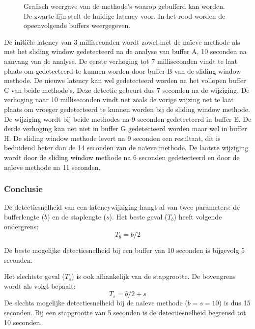 \begin{figure}[h!]
	\captionsetup{width=0.7\textwidth}
	\caption[Voorbeeld buffering methodes]{Grafisch weergave van de methode's waarop gebufferd kan worden. De zwarte lijn stelt de huidige latency voor. In het rood worden de opeenvolgende buffers weergegeven.}
	\begin{center}
		\advance\parskip0.3cm
		
	\end{center}
	\label{latency}
\end{figure}

De initiële latency van 3 milliseconden wordt zowel met de naïeve methode als met het sliding window gedetecteerd na de analyse van buffer A, 10 seconden na aanvang van de analyse. De eerste verhoging tot 7 milliseconden vindt te laat plaats om gedetecteerd te kunnen worden door buffer B van de sliding window methode. De nieuwe latency kan wel gedetecteerd worden na het vollopen buffer C van beide methode's. Deze detectie gebeurt dus 7 seconden na de wijziging. De verhoging naar 10 milliseconden vindt net zoals de vorige wijzing net te laat plaats om vroeger gedetecteerd te kunnen worden bij de sliding window methode. De wijziging wordt bij beide methodes na 9 seconden gedetecteerd in buffer E. De derde verhoging kan net niet in buffer G gedetecteerd worden maar wel in buffer H. De sliding window methode levert na 9 seconden een resultaat, dit is beduidend beter dan de 14 seconden van de naïeve methode. De laatste wijziging wordt door de sliding window methode na 6 seconden gedetecteerd en door de naïeve methode na 11 seconden.

\subsubsection{Conclusie}

De detectiesnelheid van een latencywijziging hangt af van twee parameters: de bufferlengte ($b$) en de staplengte ($s$). Het beste geval ($ T_b $) heeft volgende ondergrens:
\begin{equation}
T_b = b / 2
\end{equation}

De beste mogelijke detectiesnelheid bij een buffer van 10 seconden is bijgevolg 5 seconden.

Het slechtste geval ($ T_s $) is ook afhankelijk van de stapgrootte. De bovengrens wordt als volgt bepaalt:
\begin{equation}
T_s = b / 2 + s
\end{equation}
De slechts mogelijke detectiesnelheid bij de naïeve methode ($b = s = 10 $) is dus 15 seconden. Bij een stapgrootte van 5 seconden is de detectiesnelheid begrensd tot 10 seconden.

